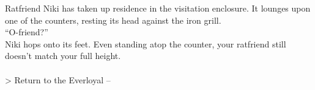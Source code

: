 Ratfriend Niki has taken up residence in the visitation enclosure. It lounges upon one of the counters, resting its head against the iron grill.\\

“O-friend?”\\
Niki hops onto its feet. Even standing atop the counter, your ratfriend still doesn’t match your full height.\\

\\
> Return to the Everloyal -- 